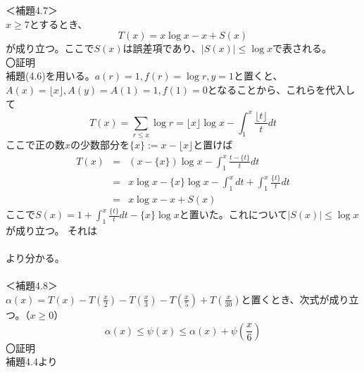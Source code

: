 \documentclass{jsarticle}
\begin{document}
＜補題4.7＞\\
\(x\geq7\)とするとき、
\begin{equation}
T(x)=x\log x-x+S(x)
\end{equation}
が成り立つ。ここで\(S(x)\)は誤差項であり、\(|S(x)|\leq\log x\)で表される。\\
〇証明\\
補題(4.6)を用いる。\(a(r)=1,f(r)=\log r,y=1\)と置くと、\(A(x)=\lfloor{x}\rfloor,A(y)=A(1)=1,f(1)=0\)となることから、これらを代入して
\[T(x)=\sum_{r\leq x}\log r=\lfloor{x}\rfloor\log x-\int_{1}^{x}\frac{\lfloor{t}\rfloor}{t}dt\]
ここで正の数\(x\)の少数部分を\(\{x\}:=x-\lfloor{x}\rfloor\)と置けば
\begin{eqnarray*}
T(x)&=&\left(x-\{x\}\right)\log x-\int_{1}^{x}\frac{t-\{t\}}{t}dt\\
&=&x\log x-\{x\}\log x-\int_{1}^{x}dt+\int_{1}^{x}\frac{\{t\}}{t}dt\\
&=&x\log x-x+S(x)
\end{eqnarray*}
ここで\hspace{3mm}\(\displaystyle S(x)=1+\int_{1}^{x}\frac{\{t\}}{t}dt-\{x\}\log x\)\hspace{3mm}と置いた。これについて\(\left|S(x)\right|\leq\log x\)が成り立つ。
それは\\
\\
より分かる。\\
\\
＜補題4.8＞\\
\(\displaystyle\alpha(x)=T(x)-T\left(\frac{x}{2}\right)-T\left(\frac{x}{3}\right)-T\left(\frac{x}{5}\right)+T\left(\frac{x}{30}\right)\)と置くとき、次式が成り立つ。（\(x\geq0\)）
\begin{equation}
\alpha(x)\leq\psi(x)\leq\alpha(x)+\psi\left(\frac{x}{6}\right)
\end{equation}
〇証明\\
補題4.4より
\end{document}
